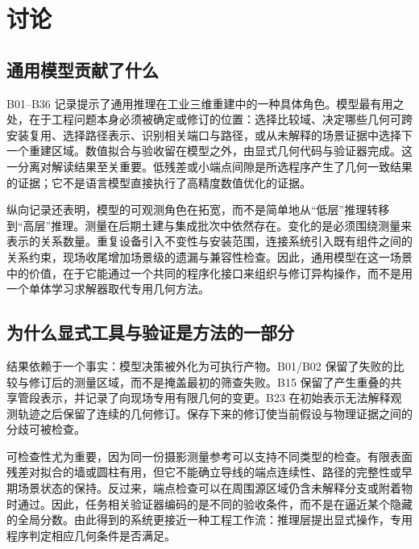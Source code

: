 \documentclass[10pt,a4paper]{article}
\begin{document}
\hypertarget{ux8ba8ux8bba}{%
\section{讨论}\label{ux8ba8ux8bba}}

\hypertarget{ux901aux7528ux6a21ux578bux8d21ux732eux4e86ux4ec0ux4e48}{%
\subsection{通用模型贡献了什么}\label{ux901aux7528ux6a21ux578bux8d21ux732eux4e86ux4ec0ux4e48}}

B01--B36
记录提示了通用推理在工业三维重建中的一种具体角色。模型最有用之处，在于工程问题本身必须被确定或修订的位置：选择比较域、决定哪些几何可跨安装复用、选择路径表示、识别相关端口与路径，或从未解释的场景证据中选择下一个重建区域。数值拟合与验收留在模型之外，由显式几何代码与验证器完成。这一分离对解读结果至关重要。低残差或小端点间隙是所选程序产生了几何一致结果的证据；它不是语言模型直接执行了高精度数值优化的证据。

纵向记录还表明，模型的可观测角色在拓宽，而不是简单地从``低层''推理转移到``高层''推理。测量在后期土建与集成批次中依然存在。变化的是必须围绕测量来表示的关系数量。重复设备引入不变性与安装范围，连接系统引入既有组件之间的关系约束，现场收尾增加场景级的遗漏与兼容性检查。因此，通用模型在这一场景中的价值，在于它能通过一个共同的程序化接口来组织与修订异构操作，而不是用一个单体学习求解器取代专用几何方法。

\hypertarget{ux4e3aux4ec0ux4e48ux663eux5f0fux5de5ux5177ux4e0eux9a8cux8bc1ux662fux65b9ux6cd5ux7684ux4e00ux90e8ux5206}{%
\subsection{为什么显式工具与验证是方法的一部分}\label{ux4e3aux4ec0ux4e48ux663eux5f0fux5de5ux5177ux4e0eux9a8cux8bc1ux662fux65b9ux6cd5ux7684ux4e00ux90e8ux5206}}

结果依赖于一个事实：模型决策被外化为可执行产物。B01/B02
保留了失败的比较与修订后的测量区域，而不是掩盖最初的筛查失败。B15
保留了产生重叠的共享管段表示，并记录了向现场专用有限几何的变更。B23
在初始表示无法解释观测轨迹之后保留了连续的几何修订。保存下来的修订使当前假设与物理证据之间的分歧可被检查。

可检查性尤为重要，因为同一份摄影测量参考可以支持不同类型的检查。有限表面残差对拟合的墙或圆柱有用，但它不能确立导线的端点连续性、路径的完整性或早期场景状态的保持。反过来，端点检查可以在周围源区域仍含未解释分支或附着物时通过。因此，任务相关验证器编码的是不同的验收条件，而不是在逼近某个隐藏的全局分数。由此得到的系统更接近一种工程工作流：推理层提出显式操作，专用程序判定相应几何条件是否满足。
\end{document}

